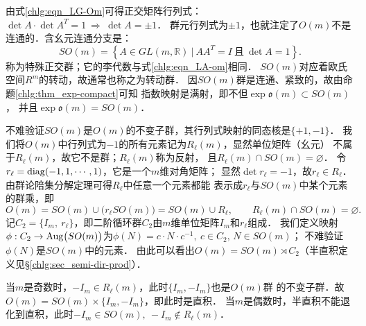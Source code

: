 由式\eqref{chlg:eqn_LG-Om}可得正交矩阵行列式：
$\det A \cdot \det A^T = 1 \ \Rightarrow \ \det A = \pm 1$．
群元行列式为$\pm 1$，也就注定了$O(m)$不是连通的．含幺元连通分支是：
\begin{equation}\label{chlg:eqn_LG-so}
    SO(m) %
    = \left\{ A \in GL(m,\mathbb{R})\ |\ A A^T =I 
    \ \text{且}\ \det A = 1 \right\} .
\end{equation}
称为{\heiti 特殊正交群}；它的李代数与式\eqref{chlg:eqn_LA-om}相同．
$SO(m)$对应着欧氏空间$R^m$的转动，故通常也称之为{\heiti 转动群}．
因$SO(m)$群是连通、紧致的，故由命题\ref{chlg:thm_exp-compact}可知
指数映射是满射，即不但$\exp \mathfrak{o}(m) \subset SO(m)$，
并且$\exp \mathfrak{o}(m) = SO(m)$．






不难验证$SO(m)$是$O(m)$的不变子群，其行列式映射的同态核是$\{+1,-1\}$．
我们将$O(m)$中行列式为$-1$的所有元素记为$R_{\ell}(m)$，显然单位矩阵（幺元）
不属于$R_{\ell}(m)$，故它不是群；$R_{\ell}(m)$称为{\heiti 反射}，
且$R_{\ell}(m)\cap SO(m)=\varnothing$．
令$r_{\ell}={\rm diag}(-1,1,\cdots,1)$，它是一个$m$维对角矩阵；
显然$\det r_{\ell} = -1$，故$r_{\ell}\in R_{\ell}$．
由群论陪集分解定理可得$R_{\ell}$中任意一个元素都能
表示成$r_{\ell}$与$SO(m)$中某个元素的群乘，即
\begin{equation*}
    O(m)= SO(m)\cup \bigl(r_{\ell}SO(m)\bigr)= SO(m) \cup R_{\ell},
    \qquad R_{\ell}(m)\cap SO(m)=\varnothing . 
\end{equation*}
记$C_2=\{I_m,\ r_{\ell}\}$，即二阶循环群$C_2$由$m$维单位矩阵$I_m$和$r_{\ell}$组成．
我们定义映射$\phi:C_2 \to {\rm Aug}\bigl(SO(m)\bigr)$为$\phi(N)=c\cdot N \cdot c^{-1},
\  c\in C_2, \, N\in SO(m)$；
不难验证$\phi(N)$是$SO(m)$中的元素．
由此可以看出$O(m)=SO(m)\rtimes C_2$（半直积定义见\S\ref{chlg:sec_semi-dir-prod}）．


当$m$是奇数时，$-I_m \in R_{\ell}(m)$，此时$\{I_m, -I_m\}$也是$O(m)$群
的不变子群．故
$O(m)=SO(m)\times \{I_m, -I_m\}$，即此时是直积．
当$m$是偶数时，半直积不能退化到直积，此时$-I_m \in SO(m), \  -I_m \notin R_{\ell}(m)$．








